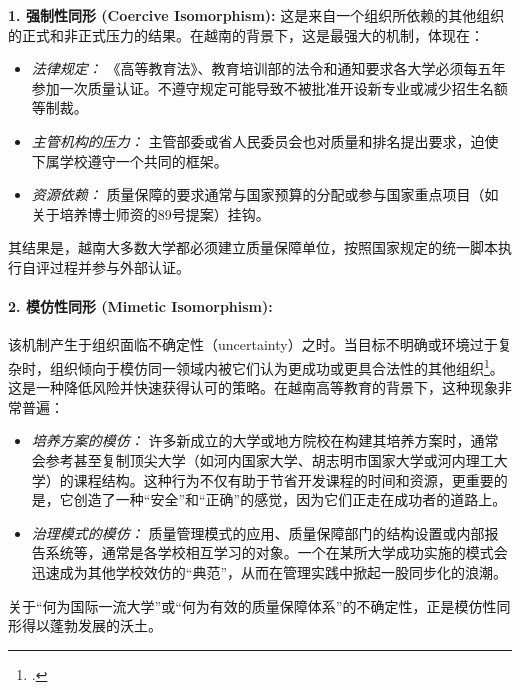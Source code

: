 \textbf{1. 强制性同形 (Coercive Isomorphism):} 这是来自一个组织所依赖的其他组织的正式和非正式压力的结果。在越南的背景下，这是最强大的机制，体现在：
\begin{itemize}
    \item \textit{法律规定：} 《高等教育法》、教育培训部的法令和通知要求各大学必须每五年参加一次质量认证。不遵守规定可能导致不被批准开设新专业或减少招生名额等制裁。
    \item \textit{主管机构的压力：} 主管部委或省人民委员会也对质量和排名提出要求，迫使下属学校遵守一个共同的框架。
    \item \textit{资源依赖：} 质量保障的要求通常与国家预算的分配或参与国家重点项目（如关于培养博士师资的89号提案）挂钩。
\end{itemize}
其结果是，越南大多数大学都必须建立质量保障单位，按照国家规定的统一脚本执行自评过程并参与外部认证。





\paragraph{2. 模仿性同形 (Mimetic Isomorphism):}
该机制产生于组织面临不确定性（uncertainty）之时。当目标不明确或环境过于复杂时，组织倾向于模仿同一领域内被它们认为更成功或更具合法性的其他组织\footcite{DiMaggioPowell1983}。这是一种降低风险并快速获得认可的策略。在越南高等教育的背景下，这种现象非常普遍：
\begin{itemize}
    \item \textit{培养方案的模仿：} 许多新成立的大学或地方院校在构建其培养方案时，通常会参考甚至复制顶尖大学（如河内国家大学、胡志明市国家大学或河内理工大学）的课程结构。这种行为不仅有助于节省开发课程的时间和资源，更重要的是，它创造了一种“安全”和“正确”的感觉，因为它们正走在成功者的道路上。
    \item \textit{治理模式的模仿：} 质量管理模式的应用、质量保障部门的结构设置或内部报告系统等，通常是各学校相互学习的对象。一个在某所大学成功实施的模式会迅速成为其他学校效仿的“典范”，从而在管理实践中掀起一股同步化的浪潮。
\end{itemize}
关于“何为国际一流大学”或“何为有效的质量保障体系”的不确定性，正是模仿性同形得以蓬勃发展的沃土。

